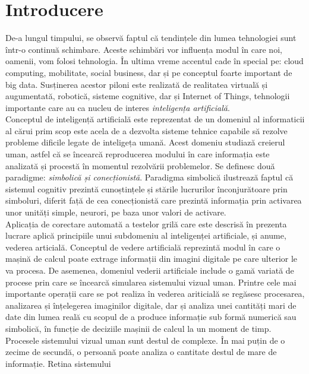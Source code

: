 \documentclass[a4paper,12pt]{report}
\newcommand\tab[1][1cm]{\hspace*{#1}}
\begin{document}
\chapter{Introducere}
\tab De-a lungul timpului, se observă faptul că tendințele din lumea tehnologiei sunt într-o continuă schimbare. Aceste schimbări vor influența modul în care 
noi, oamenii, vom folosi tehnologia. În ultima vreme accentul cade în special pe: cloud computing, mobilitate, social business, dar și pe conceptul foarte
important de big data. Susținerea acestor piloni este realizată de realitatea virtuală și augumentată, robotică, sisteme cognitive, dar și Internet of Things,
tehnologii importante care au ca nucleu de interes \textit {inteligența artificială}. 
\\ \tab Conceptul de inteligență artificială este reprezentat de un domeniul al informaticii al cărui prim scop este acela de a dezvolta sisteme tehnice capabile 
să rezolve probleme dificile legate de inteligeța umană. Acest domeniu studiază creierul uman, astfel că se încearcă reproducerea modului în care informația este
analizată și procestă în momentul rezolvării problemelor. Se definesc două paradigme: \textit {simbolică și conecționistă}. Paradigma simbolică ilustrează faptul 
că sistemul cognitiv prezintă cunoștințele și stările lucrurilor înconjurătoare prin simboluri, diferit față de cea conecționistă care prezintă informația prin activarea
unor unități simple, neurori, pe baza unor valori de activare.
\\ \tab Aplicația de corectare automată a testelor grilă care este descrisă în prezenta lucrare aplică principiile unui subdomeniu al inteligenței artificiale, și anume,
vederea articială. 
\newline \tab Conceptul de vedere artificială reprezintă modul în care o mașină de calcul poate extrage informații din imagini 
digitale pe care ulterior le va procesa. De asemenea, domeniul vederii artificiale include o gamă variată de procese prin care se încearcă simularea sistemului vizual uman. 
\newline \tab Printre cele mai importante operații care se pot realiza în vederea ariticială se regăsesc procesarea, analizarea și înțelegerea imaginilor digitale, dar și analiza unei cantități mari
de date din lumea reală cu scopul de a produce informație sub formă numerică sau simbolică, în funcție de deciziile mașinii de calcul la un moment de timp. 
Procesele sistemului vizual uman sunt destul de complexe. În mai puțin de o zecime de secundă, o persoană poate analiza o cantitate destul de mare de informație. Retina sistemului
\end{document}
